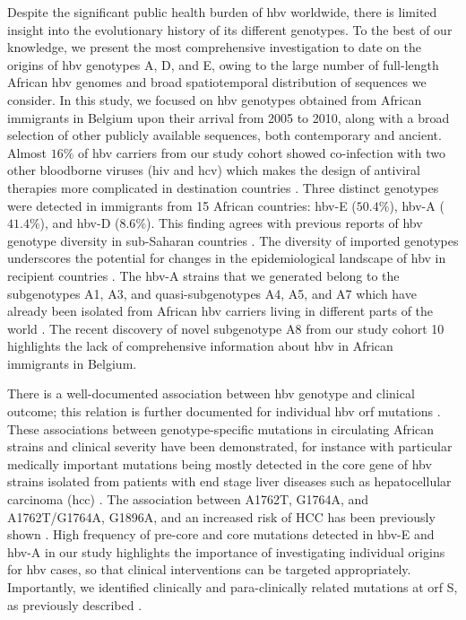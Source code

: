 Despite the significant public health burden of \gls{hbv} worldwide, there is limited insight into the evolutionary history of its different genotypes.
To the best of our knowledge, we present the most comprehensive investigation to date on the origins of \gls{hbv} genotypes A, D, and E, owing to the large number of full-length African \gls{hbv} genomes and broad spatiotemporal distribution of sequences we consider.
In this study, we focused on \gls{hbv} genotypes obtained from African immigrants in Belgium upon their arrival from 2005 to 2010, along with a broad selection of other publicly available sequences, both contemporary and ancient.
Almost $16\%$ of \gls{hbv} carriers from our study cohort showed co-infection with two other bloodborne viruses (\gls{hiv} and \gls{hcv}) which makes the design of antiviral therapies more complicated in destination countries \citep{arora2021complexities,torimiro2018rates}.
Three distinct genotypes were detected in immigrants from 15 African countries: \gls{hbv}-E ($50.4\%$), \gls{hbv}-A ($41.4\%$), and \gls{hbv}-D ($8.6\%$).
This finding agrees with previous reports of \gls{hbv} genotype diversity in sub-Saharan countries \citep{forbi2013disparate,andernach2009slave}.
The diversity of imported genotypes underscores the potential for changes in the epidemiological landscape of \gls{hbv} in recipient countries \citep{mina201715,aguilera2020gehep}.
The \gls{hbv}-A strains that we generated belong to the subgenotypes A1, A3, and quasi-subgenotypes A4, A5, and A7 which have already been isolated from African \gls{hbv} carriers living in different parts of the world \citep{andernach2009slave,kurbanov2005new,olinger2006phylogenetic,pourkarim2010novel}.
The recent discovery of novel subgenotype A8 from our study cohort 10 highlights the lack of comprehensive information about \gls{hbv} in African immigrants in Belgium.

There is a well-documented association between \gls{hbv} genotype and clinical outcome; this relation is further documented for individual \gls{hbv} \gls{orf} mutations \citep{mina2015genomic,mina201715,liu2009associations,mello2014hepatitis,hou2019hcc-associated}.
These associations between genotype-specific mutations in circulating African strains and clinical severity have been demonstrated, for instance with particular medically important mutations being mostly detected in the core gene of \gls{hbv} strains isolated from patients with end stage liver diseases such as hepatocellular carcinoma (\gls{hcc}) \citep{amougou2019enrichment,mbamalu2021hepatitis,mak2020molecular}.
The association between A1762T, G1764A, and A1762T/G1764A, G1896A, and an increased risk of HCC has been previously shown \citep{wei2017association}.
High frequency of pre-core and core mutations detected in \gls{hbv}-E and \gls{hbv}-A in our study highlights the importance of investigating individual origins for \gls{hbv} cases, so that clinical interventions can be targeted appropriately.
Importantly, we identified clinically and para-clinically related mutations at \gls{orf} S, as previously described \citep{olusola2021profiles,mak2020molecular,lin2021hepatitis}.

